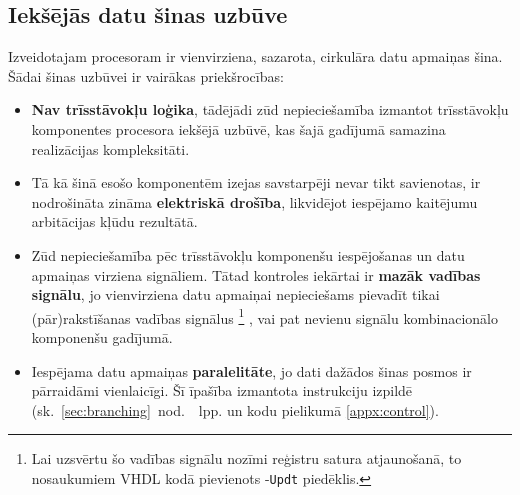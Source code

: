 \subsection{Iekšējās datu šinas uzbūve} \label{sec:databus}
Izveidotajam procesoram ir vienvirziena, sazarota, 
cirkulāra datu apmaiņas šina.
Šādai šinas uzbūvei ir vairākas priekšrocības:
\begin{itemize}
	\item \textbf{Nav trīsstāvokļu loģika}, tādējādi zūd nepieciešamība
		izmantot trīsstāvokļu komponentes procesora iekšējā uzbūvē,
		kas šajā gadījumā samazina realizācijas kompleksitāti.
	\item Tā kā šinā esošo komponentēm izejas savstarpēji nevar tikt
		savienotas, ir nodrošināta zināma \textbf{elektriskā drošība},
		likvidējot iespējamo kaitējumu arbitācijas kļūdu rezultātā.
	\item Zūd nepieciešamība pēc trīsstāvokļu komponenšu iespējošanas un
		datu apmaiņas virziena signāliem. Tātad kontroles iekārtai ir
		\textbf{mazāk vadības signālu}, jo vienvirziena datu
		apmaiņai nepieciešams pievadīt tikai (pār)rakstīšanas vadības signālus%
		\footnote{Lai uzsvērtu šo vadības signālu nozīmi reģistru satura
			atjaunošanā, to nosaukumiem VHDL kodā pievienots -\texttt{Updt} piedēklis.}%
		, vai pat nevienu signālu kombinacionālo komponenšu gadījumā.
	\item Iespējama datu apmaiņas \textbf{paralelitāte}, jo dati dažādos
		šinas posmos ir pārraidāmi vienlaicīgi. Šī īpašība izmantota
		 instrukciju izpildē 
		(sk.~\ref{sec:branching}~nod.~\pageref{sec:branching}~lpp. un kodu
		pielikumā \ref{appx:control}).
\end{itemize}

